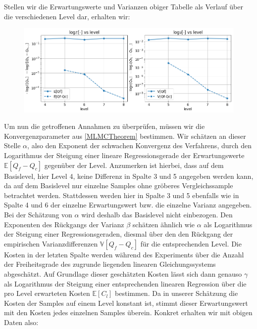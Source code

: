 Stellen wir die Erwartungswerte und Varianzen obiger Tabelle als Verlauf über die verschiedenen Level dar, erhalten wir:

\begin{figure}[H]
	\centering
	\includegraphics[width=\textwidth]{plots/mlmckonv.png} 
\end{figure}

Um nun die getroffenen Annahmen zu überprüfen, müssen wir die Konvergenzparameter aus \eqref{MLMCTheorem} bestimmen.
Wir schätzen an dieser Stelle $ \alpha $, also den Exponent der schwachen Konvergenz des Verfahrens, durch den Logarithmus der Steigung einer lineare Regressionsgerade der Erwartungswerte $ \mathbb{E}[Q_f - Q_c] $ gegenüber der Level. Anzumerken ist hierbei, dass auf dem Basislevel, hier Level 4, keine Differenz in Spalte 3 und 5 angegeben werden kann, da auf dem Basislevel nur einzelne Samples ohne gröberes Vergleichssample betrachtet werden. Stattdessen werden hier in Spalte 3 und 5 ebenfalls wie in Spalte 4 und 6 der einzelne Erwartungswert bzw. die einzelne Varianz angegeben. Bei der Schätzung von $ \alpha $ wird deshalb das Basislevel nicht einbezogen.
Den Exponenten des Rückgangs der Varianz $ \beta $ schätzen ähnlich wie $ \alpha $ als Logarithmus der Steigung einer Regressionsgeraden, diesmal über den den Rückgang der empirischen Varianzdifferenzen  $ \mathbb{V}[Q_f-Q_c] $ für die entsprechenden Level. Die Kosten in der letzten Spalte werden während des Experiments über die Anzahl der Freiheitsgrade des zugrunde liegenden linearen Gleichungssystems abgeschätzt. 
Auf Grundlage dieser geschätzten Kosten lässt sich dann genauso $ \gamma $ als Logarithmus der Steigung einer entsprechenden linearen Regression über die pro Level erwarteten Kosten $ \mathbb{E}[C_l] $ bestimmen. Da in unserer Schätzung die Kosten der Samples auf einem Level konstant ist, stimmt dieser Erwartungswert mit den Kosten jedes einzelnen Samples überein.  
Konkret erhalten wir mit obigen Daten also: 

